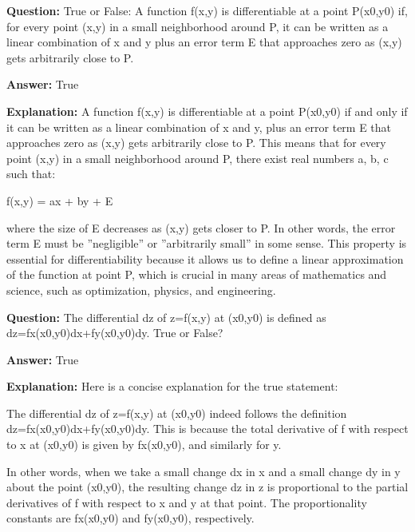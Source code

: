 \documentclass{article}
\begin{document}
                \vspace{0.5cm} 
        
            
                \textbf {Question:} True or False: A function f(x,y) is differentiable at a point P(x0,y0) if, for every point (x,y) in a small neighborhood around P, it can be written as a linear combination of x and y plus an error term E that approaches zero as (x,y) gets arbitrarily close to P.
                
                \textbf{Answer:} True

                \textbf{Explanation:} A function f(x,y) is differentiable at a point P(x0,y0) if and only if it can be written as a linear combination of x and y, plus an error term E that approaches zero as (x,y) gets arbitrarily close to P. This means that for every point (x,y) in a small neighborhood around P, there exist real numbers a, b, c such that:

f(x,y) = ax + by + E

where the size of E decreases as (x,y) gets closer to P. In other words, the error term E must be ''negligible'' or ''arbitrarily small'' in some sense. This property is essential for differentiability because it allows us to define a linear approximation of the function at point P, which is crucial in many areas of mathematics and science, such as optimization, physics, and engineering.
                
                \vspace{0.5cm} 
        
            
                \textbf {Question:} The differential dz of z=f(x,y) at (x0,y0) is defined as dz=fx(x0,y0)dx+fy(x0,y0)dy. True or False?
                
                \textbf{Answer:} True

                \textbf{Explanation:} Here is a concise explanation for the true statement:

The differential dz of z=f(x,y) at (x0,y0) indeed follows the definition dz=fx(x0,y0)dx+fy(x0,y0)dy. This is because the total derivative of f with respect to x at (x0,y0) is given by fx(x0,y0), and similarly for y.

In other words, when we take a small change dx in x and a small change dy in y about the point (x0,y0), the resulting change dz in z is proportional to the partial derivatives of f with respect to x and y at that point. The proportionality constants are fx(x0,y0) and fy(x0,y0), respectively.
\end{document}
